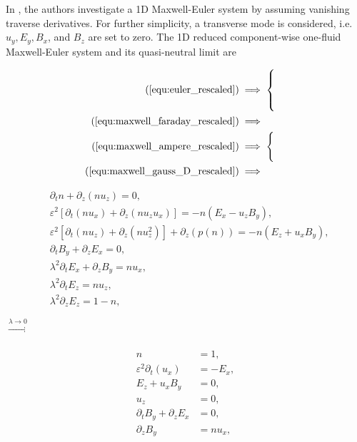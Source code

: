 \documentclass{article}
\begin{document}
In \cite{degond_2012}, the authors investigate a 1D Maxwell-Euler system by assuming vanishing traverse derivatives. For further simplicity, a transverse mode is considered, i.e. $u_y, E_y, B_x$, and $B_z$ are set to zero.  The 1D reduced component-wise one-fluid Maxwell-Euler system and its quasi-neutral limit are 

\vspace{-0.3cm}
\begin{minipage}{0.07\textwidth}
    \begin{align*}
        (\ref{equ:euler_rescaled})&\implies
        \begin{cases}
            \\
            \\
            \\
        \end{cases} \\
        (\ref{equ:maxwell_faraday_rescaled}) &\implies \\
        (\ref{equ:maxwell_ampere_rescaled})  &\implies 
        \begin{cases}
            \\
            \\
        \end{cases} \\
        (\ref{equ:maxwell_gauss_D_rescaled}) & \implies
    \end{align*}    
\end{minipage}
\begin{minipage}{0.4\textwidth}
    \begin{align*}
        &\partial_t n + \partial_z(nu_z) = 0, \\
        &\varepsilon^2[\partial_t(nu_x) + \partial_z(nu_zu_x)] = - n(E_x - u_zB_y), \\
        &\varepsilon^2[\partial_t(nu_z) + \partial_z(nu_z^2)] + \partial_z(p(n)) = -n(E_z + u_xB_y), \\
        &\partial_t B_y + \partial_z E_x = 0, \\
        &\lambda^2 \partial_t E_x + \partial_z B_y = nu_x, \\
        &\lambda^2 \partial_t E_z = nu_z, \\
        &\lambda^2 \partial_z E_z = 1 - n,
    \end{align*}
\end{minipage}
\hspace{0.5cm}$\xrightarrow[]{\lambda \rightarrow 0}$
\begin{minipage}{0.3\textwidth}
    \begin{align*}
        n &= 1,\\
        \varepsilon^2 \partial_t(u_x) &= - E_x, \\
        E_z + u_xB_y &= 0, \\
        u_z &= 0, \\
        \partial_t B_y + \partial_z E_x &= 0, \\
        \partial_z B_y &= nu_x,
    \end{align*}
\end{minipage}
\end{document}
